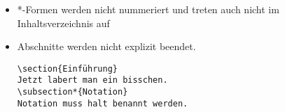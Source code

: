 \begin{frame}[fragile]
\begin{itemize}
\begin{itemize}
        \item \lstinline!\subparagraph!, \lstinline!\subparagraph*!
      \end{itemize}
    \item<+-> *-Formen werden nicht nummeriert und treten auch nicht im
      Inhaltsverzeichnis auf
    \item<+-> Abschnitte werden nicht explizit beendet.
\begin{lstlisting}
\section{Einführung}
Jetzt labert man ein bisschen.
\subsection*{Notation}
Notation muss halt benannt werden.
\end{lstlisting}
  \end{itemize}

\end{frame}

